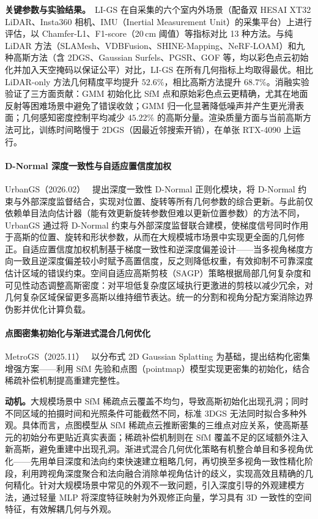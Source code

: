 \textbf{关键参数与实验结果。}~LI-GS 在自采集的六个室内外场景（配备双 HESAI XT32 LiDAR、Insta360 相机、IMU（Inertial Measurement Unit）的采集平台）上进行评估，以 Chamfer-L1、F1-score（20\,cm 阈值）等指标对比 13 种方法。与纯 LiDAR 方法（SLAMesh、VDBFusion、SHINE-Mapping、NeRF-LOAM）和九种高斯方法（含 2DGS、Gaussian Surfels、PGSR、GOF 等，均以彩色点云初始化并加入天空掩码以保证公平）对比，LI-GS 在所有几何指标上均取得最优。相比 LiDAR-only 方法几何精度平均提升 $52.6\%$，相比高斯方法提升 $68.7\%$。消融实验验证了三方面贡献：GMM 初始化比 SfM 点和原始彩色点云更精确，尤其在地面反射等困难场景中避免了错误收敛；GMM 归一化显著降低噪声并产生更光滑表面；几何感知密度控制平均减少 $45.22\%$ 的高斯分量。渲染质量方面与当前高斯方法可比，训练时间略慢于 2DGS（因最近邻搜索开销），在单张 RTX-4090 上运行。

\paragraph{D-Normal 深度一致性与自适应置信度加权}

UrbanGS（2026.02）~\cite{2602_02089} 提出深度一致性 D-Normal 正则化模块，将 D-Normal 约束与外部深度监督结合，实现对位置、旋转等所有几何参数的综合更新。与此前仅依赖单目法向估计器（能有效更新旋转参数但难以更新位置参数）的方法不同，UrbanGS 通过将 D-Normal 约束与外部深度监督联合建模，使梯度信号同时作用于高斯的位置、旋转和形状参数，从而在大规模城市场景中实现更全面的几何修正。自适应置信度加权机制基于梯度一致性和逆深度偏差设计——当多视角梯度方向一致且逆深度偏差较小时赋予高置信度，反之则降低权重，有效抑制不可靠深度估计区域的错误约束。空间自适应高斯剪枝（SAGP）策略根据局部几何复杂度和可见性动态调整高斯密度：对平坦低复杂度区域执行更激进的剪枝以减少冗余，对几何复杂区域保留更多高斯以维持细节表达。统一的分割和视角分配方案消除边界伪影并优化计算负载。

\paragraph{点图密集初始化与渐进式混合几何优化}

MetroGS（2025.11）~\cite{2511_19172} 以分布式 2D Gaussian Splatting 为基础，提出结构化密集增强方案——利用 SfM 先验和点图（pointmap）模型实现更密集的初始化，结合稀疏补偿机制提高重建完整性。

\textbf{动机。}大规模场景中 SfM 稀疏点云覆盖不均匀，导致高斯初始化出现孔洞；同时不同区域的拍摄时间和光照条件可能截然不同，标准 3DGS 无法同时拟合多种外观。具体而言，点图模型从 SfM 稀疏点云推断密集的三维点对应关系，使高斯基元的初始分布更贴近真实表面；稀疏补偿机制则在 SfM 覆盖不足的区域额外注入新高斯，避免重建中出现孔洞。渐进式混合几何优化策略有机整合单目和多视角优化——先用单目深度和法向约束快速建立粗略几何，再切换至多视角一致性精化阶段，利用跨视角深度聚合和法向融合消除单视角估计的歧义，实现高效且精确的几何精化。针对大规模场景中常见的外观不一致问题，引入深度引导的外观建模方法，通过轻量 MLP 将深度特征映射为外观修正向量，学习具有 3D 一致性的空间特征，有效解耦几何与外观。

